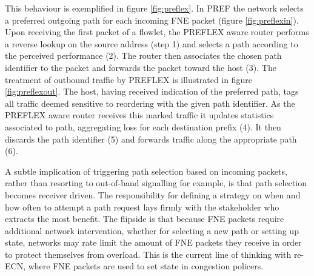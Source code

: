 This behaviour is exemplified in figure \ref{fig:preflex}.  
In \ac{PREF} the network selects a preferred outgoing path for each incoming \ac{FNE} packet (figure \ref{fig:preflexin}). 
Upon receiving the first packet of a flowlet, the \ac{PREFLEX} aware router performs a reverse lookup on the source address (step 1) and selects a path according to the perceived performance (2). 
The router then associates the chosen path identifier to the packet and forwards the packet toward the host (3).
The treatment of outbound traffic by \ac{PREFLEX} is illustrated in figure \ref{fig:preflexout}. 
The host, having received indication of the preferred path, tags all traffic deemed sensitive to reordering with the given path identifier. 
As the \ac{PREFLEX} aware router receives this marked traffic it updates statistics associated to path, aggregating loss for each destination prefix (4). 
It then discards the path identifier (5) and forwards traffic along the appropriate path (6). 

A subtle implication of triggering path selection based on incoming packets, rather than resorting to out-of-band signalling for example, is that path selection becomes receiver driven. The responsibility for defining a strategy on when and how often to attempt a path request lays firmly with the stakeholder who extracts the most benefit. The flipside is that because \ac{FNE} packets require additional network intervention, whether for selecting a new path or setting up state, networks may rate limit the amount of \ac{FNE} packets they receive in order to protect themselves from overload. This is the current line of thinking with re-\ac{ECN}, where \ac{FNE} packets are used to set state in congestion policers.

